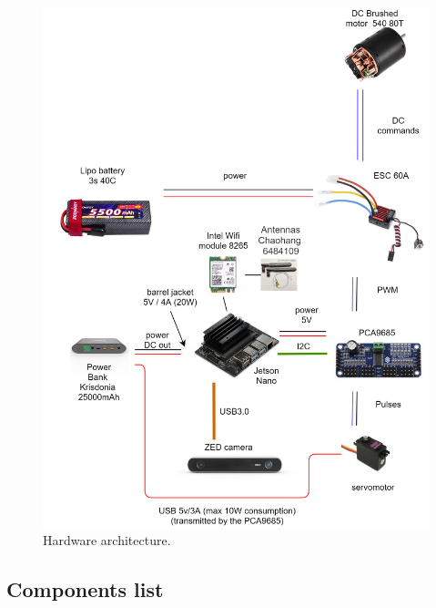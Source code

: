 		\begin{figure}[!htbp]
			\centering
			\includegraphics[width=1.0\columnwidth, height = 1.3\columnwidth]{imgs/hardware.png}
			\caption{Hardware architecture.}
			\label{hardwarepng}
		\end{figure}

		\FloatBarrier

		\subsection{Components list}
		
